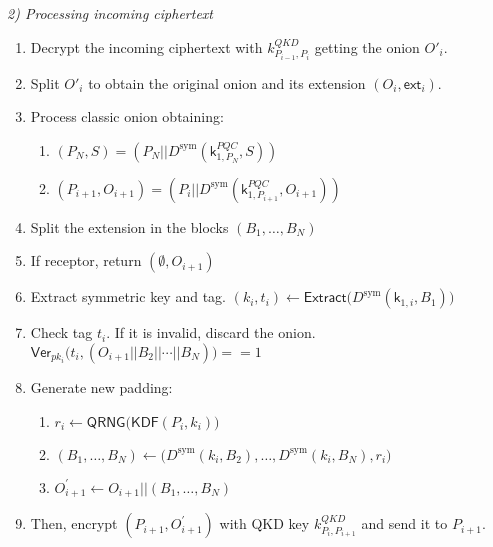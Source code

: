 \documentclass[conference]{IEEEtran}
\begin{document}
\emph{2) Processing incoming ciphertext}
\label{subsubsec:processing-on}
\begin{enumerate}[label=\roman*.] 
    \item Decrypt the incoming ciphertext with $k^{QKD}_{P_{i-1},P_{i}}$ getting the onion \(O'_i\).
    
    \item Split \(O'_i\) to obtain the original onion and its extension \((O_i, \mathsf{ext}_i)\).

    \item Process classic onion obtaining: 
        \begin{enumerate}
            \item \((P_{N}, S) = (P_{N} || D^{\text{sym}}(\mathsf{k}^{PQC}_{1,P_N},S) )\)

            \item \((P_{i+1}, O_{i+1})= (P_i || D^{\text{sym}}(\mathsf{k}^{PQC}_{1,P_{i+1}},O_{i+1}))\) 
        \end{enumerate}

    \item Split the extension in the blocks \((B_1, \dots, B_N)\)

    \item If receptor, return $(\emptyset, O_{i+1})$

    \item Extract symmetric key and tag. \((k_i, t_i) \longleftarrow \mathsf{Extract}\bigl(
        D^{\text{sym}}(\mathsf{k}_{1,i},B_1) \bigr)\)

    \item Check tag $t_i$. If it is invalid, discard the onion. \(\mathsf{Ver}_{pk_i}\bigl(t_i, (O_{i+1}||B_2|| \cdots || B_N)
        \bigr) == 1\)

    \item Generate new padding:
        \begin{enumerate}
            \item \(r_i \longleftarrow \mathsf{QRNG}\bigl( \mathsf{KDF}(P_i, k_i)\bigr)\)
            
            \item \((B_1,\dots,B_N)\longleftarrow \bigl( D^{\text{sym}}(k_i, B_2), \dots, D^{\text{sym}}(k_i, B_N), r_i \bigr)\) 

            \item \(O^\prime_{i+1} \longleftarrow O_{i+1} || (B_1,\dots,B_N)\)
        \end{enumerate}

    \item Then, encrypt $(P_{i+1}, O^\prime_{i+1})$ with QKD key $k^{QKD}_{P_i,P_{i+1}}$ and send it to \(P_{i+1}\).
\end{enumerate}
\end{document}
